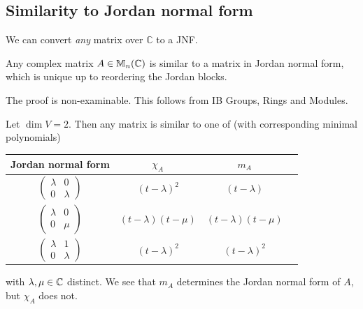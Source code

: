 \documentclass[a4paper,11pt]{article}
\begin{document}
\subsection{Similarity to Jordan normal form}
We can convert \textit{any} matrix over $\mathbb{C}$ to a JNF. 
\begin{theorem}
	Any complex matrix \( A \in {\mathbb{M}}_n(\mathbb C) \) is similar to a matrix in Jordan normal form, which is unique up to reordering the Jordan blocks.
\end{theorem}

The proof is non-examinable.
This follows from IB Groups, Rings and Modules.

\begin{example}
	Let \( \dim V = 2 \).
	Then any matrix is similar to one of (with corresponding minimal polynomials) 
	\begin{center}
		\begin{tabular}{cccc}
		  \toprule
		  Jordan normal form & $\chi_A$ & $m_A$\\
		  \midrule
		  $\begin{pmatrix} \lambda & 0\\ 0 & \lambda \end{pmatrix}$ & $(t - \lambda)^2$ & $(t - \lambda)$\\\addlinespace
		  $\begin{pmatrix} \lambda & 0\\ 0 & \mu \end{pmatrix}$ & $(t - \lambda)(t - \mu)$ & $(t - \lambda)(t - \mu)$\\\addlinespace
		  $\begin{pmatrix} \lambda & 1\\ 0 & \lambda \end{pmatrix}$ & $(t - \lambda)^2$ & $(t - \lambda)^2$\\
		  \bottomrule
		\end{tabular}
	  \end{center}
	  with $\lambda, \mu \in {\mathbb{C}}$ distinct. We see that $m_A$ determines the Jordan normal form of $A$, but $\chi_A$ does not.
\end{example}
\end{document}
